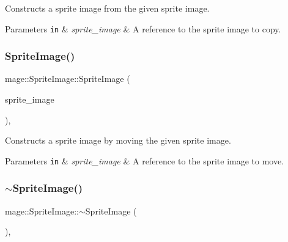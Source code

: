 Constructs a sprite image from the given sprite image.


\begin{DoxyParams}[1]{Parameters}
\mbox{\tt in}  & {\em sprite\+\_\+image} & A reference to the sprite image to copy. \\
\hline
\end{DoxyParams}
\hypertarget{classmage_1_1_sprite_image_a4490dea28c647b80324ea26cc93b2f82}{}\label{classmage_1_1_sprite_image_a4490dea28c647b80324ea26cc93b2f82} 
\subsubsection{\texorpdfstring{Sprite\+Image()}{SpriteImage()}\hspace{0.1cm}{\footnotesize\ttfamily [3/3]}}
{\footnotesize\ttfamily mage\+::\+Sprite\+Image\+::\+Sprite\+Image (\begin{DoxyParamCaption}\item[{\hyperlink{classmage_1_1_sprite_image}{Sprite\+Image} \&\&}]{sprite\+\_\+image }\end{DoxyParamCaption})\hspace{0.3cm}{\ttfamily [default]}, {\ttfamily [noexcept]}}

Constructs a sprite image by moving the given sprite image.


\begin{DoxyParams}[1]{Parameters}
\mbox{\tt in}  & {\em sprite\+\_\+image} & A reference to the sprite image to move. \\
\hline
\end{DoxyParams}
\hypertarget{classmage_1_1_sprite_image_a9121ee110f7e64ee6e936e0d3350ab44}{}\label{classmage_1_1_sprite_image_a9121ee110f7e64ee6e936e0d3350ab44} 
\subsubsection{\texorpdfstring{$\sim$\+Sprite\+Image()}{~SpriteImage()}}
{\footnotesize\ttfamily mage\+::\+Sprite\+Image\+::$\sim$\+Sprite\+Image (\begin{DoxyParamCaption}{ }\end{DoxyParamCaption})\hspace{0.3cm}{\ttfamily [virtual]}, {\ttfamily [default]}}

